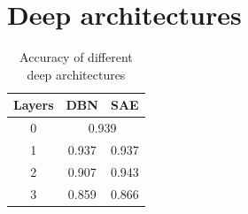 \documentclass{article}
\begin{document}
\section{Deep architectures}

\begin{table}[!ht]
  \centering
  \caption{Accuracy of different deep architectures}
  \begin{tabular}{ccc}
    Layers & DBN & SAE \\ \midrule
    0 & \multicolumn{2}{c}{0.939} \\
    1 & 0.937 & 0.937 \\
    2 & 0.907 & 0.943 \\
    3 & 0.859 & 0.866
  \end{tabular}
\end{table}
\end{document}
